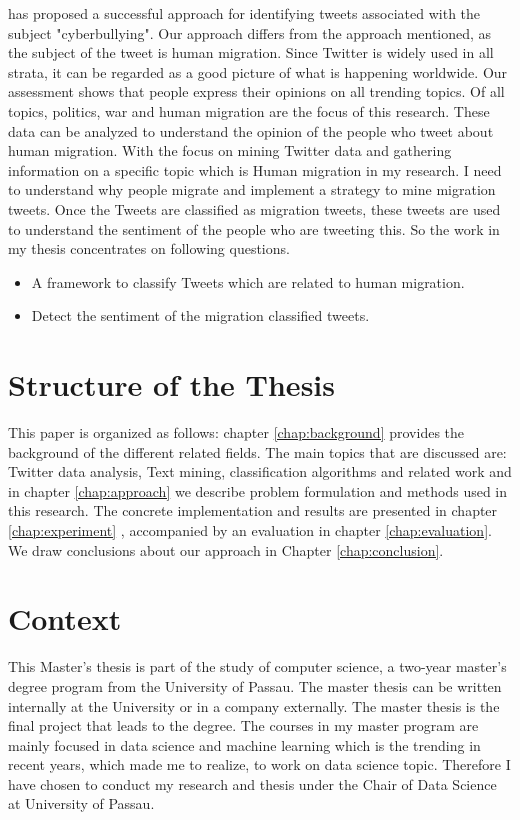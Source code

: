 \cite{Cortis} has proposed a successful approach for identifying tweets associated with the subject "cyberbullying". Our approach differs from the approach mentioned, as the subject of the tweet is human migration. Since Twitter is widely used in all strata, it can be regarded as a good picture of what is happening worldwide.  Our assessment shows that people express their opinions on all trending topics. Of all topics, politics, war and human migration are the focus of this research. These data can be analyzed to understand the opinion of the people who tweet about human migration.  With the focus on mining Twitter data and gathering information on a specific topic which is Human migration in my research. I need to understand why people migrate and implement a strategy to mine migration tweets. Once the Tweets are classified as migration tweets, these tweets are used to understand the sentiment of the people who are tweeting this. So the work in my thesis concentrates on following questions.


  

\begin{itemize}
  \item A framework to classify Tweets which are related to human migration.
  \item Detect the sentiment of the migration classified tweets. 
\end{itemize}

\section{Structure of the Thesis}
This paper is organized as follows: chapter \ref{chap:background}  provides the background of the different related fields.
The main topics that are discussed are: Twitter data analysis, Text mining, classification algorithms and related work and in chapter \ref{chap:approach} we describe problem formulation and methods used in this research. The concrete implementation and results are
presented in chapter \ref{chap:experiment} , accompanied by an evaluation in chapter \ref{chap:evaluation}. We draw
conclusions about our approach in Chapter \ref{chap:conclusion}.

\section{Context}
This Master's thesis is part of the study of computer science, a two-year master's degree program from the University of Passau. The master thesis can be written internally at the University or in a company externally. The master thesis is the final project that leads to the degree. The courses in my master program are mainly focused in data science and machine learning which is the trending in recent years, which made me to realize, to work on data science topic. Therefore I have chosen to conduct my research and thesis under the Chair of Data Science at University of Passau. 

